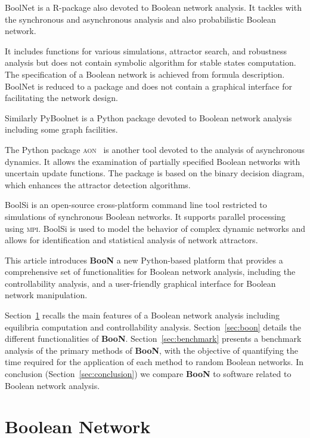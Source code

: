 \documentclass[numsec,webpdf,modern,large]{oup-authoring-template}
\newcommand{\boon}[0]{\textbf{BooN}\xspace}
\begin{document}
	 BoolNet\citep{mussel2010} is a R-package also devoted to Boolean network analysis.
	 It tackles with the synchronous and asynchronous analysis and also probabilistic Boolean network.
	 
	 It includes functions for various simulations,  attractor search, and robustness analysis but does not contain symbolic algorithm for stable states computation.
	 The specification of a Boolean network is achieved from formula description.
	 BoolNet is reduced to a package and does not contain a graphical interface for facilitating the network design. 
	 
	 Similarly PyBoolnet\citep{klarner2017} is a Python package devoted to Boolean network analysis including some graph facilities. 
	 
	 The Python package \textsc{aon}~\citep{Benes2022} is another tool devoted to the analysis of asynchronous dynamics. It allows the examination of partially specified Boolean networks with uncertain update functions. The package is based on the binary decision diagram, which enhances the attractor detection algorithms.
	 
	 BoolSi\citep{oles2020}  is an open-source cross-platform command line tool restricted  to simulations of synchronous Boolean networks.
	 It supports parallel processing using \textsc{mpi}.
	 BoolSi is used to model the behavior of complex dynamic networks and allows for identification and statistical analysis of network attractors.
	 
	This article introduces \boon a new Python-based platform that provides a comprehensive set of functionalities for Boolean network analysis, including the controllability analysis,  and a user-friendly graphical interface for Boolean network manipulation.
	
	Section~\ref{sec:boolean-network} recalls the main features of a Boolean network analysis including equilibria computation and controllability analysis.
	Section~\ref{sec:boon} details the different functionalities of \boon.
	Section~\ref{sec:benchmark} presents a benchmark analysis of the primary methods of \boon, with the objective of quantifying the time required for the application of each method to random Boolean networks. 
	In conclusion	(Section~\ref{sec:conclusion}) we compare \boon to software  related to Boolean network analysis.
	

	
	\section{Boolean Network}
	\label{sec:boolean-network}
\end{document}
